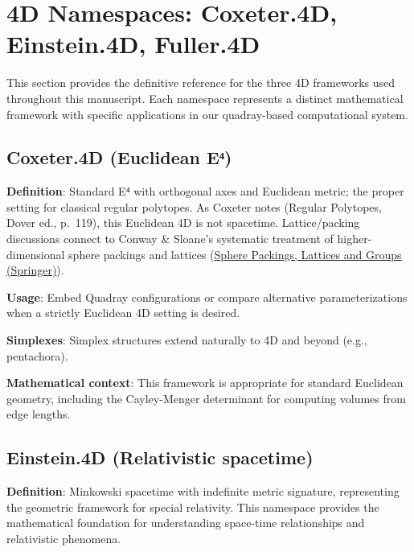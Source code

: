\documentclass[
  10pt,
]{article}
\begin{document}
\newpage

\hypertarget{d-namespaces-coxeter.4d-einstein.4d-fuller.4d}{%
\section{4D Namespaces: Coxeter.4D, Einstein.4D,
Fuller.4D}\label{d-namespaces-coxeter.4d-einstein.4d-fuller.4d}}

This section provides the definitive reference for the three 4D
frameworks used throughout this manuscript. Each namespace represents a
distinct mathematical framework with specific applications in our
quadray-based computational system.

\hypertarget{coxeter.4d-euclidean-eux2074}{%
\subsection{Coxeter.4D (Euclidean
E⁴)}\label{coxeter.4d-euclidean-eux2074}}

\textbf{Definition}: Standard E⁴ with orthogonal axes and Euclidean
metric; the proper setting for classical regular polytopes. As Coxeter
notes (Regular Polytopes, Dover ed., p.~119), this Euclidean 4D is not
spacetime. Lattice/packing discussions connect to Conway \& Sloane's
systematic treatment of higher-dimensional sphere packings and lattices
(\href{https://link.springer.com/book/10.1007/978-1-4757-6568-7}{Sphere
Packings, Lattices and Groups (Springer)}).

\textbf{Usage}: Embed Quadray configurations or compare alternative
parameterizations when a strictly Euclidean 4D setting is desired.

\textbf{Simplexes}: Simplex structures extend naturally to 4D and beyond
(e.g., pentachora).

\textbf{Mathematical context}: This framework is appropriate for
standard Euclidean geometry, including the Cayley-Menger determinant for
computing volumes from edge lengths.

\hypertarget{einstein.4d-relativistic-spacetime}{%
\subsection{Einstein.4D (Relativistic
spacetime)}\label{einstein.4d-relativistic-spacetime}}

\textbf{Definition}: Minkowski spacetime with indefinite metric
signature, representing the geometric framework for special relativity.
This namespace provides the mathematical foundation for understanding
space-time relationships and relativistic phenomena.
\end{document}
